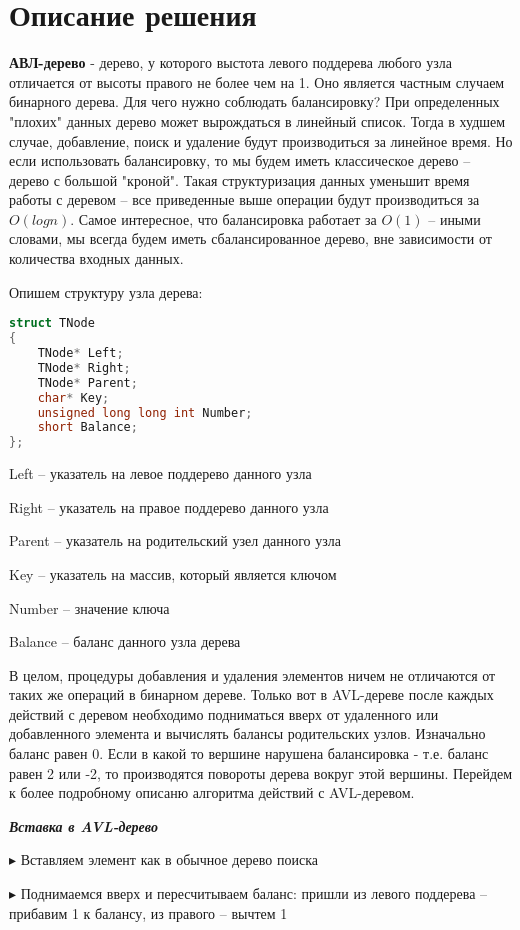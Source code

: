 \section{Описание решения}
\textbf{АВЛ-дерево} - дерево, у которого выстота левого поддерева любого узла отличается от высоты правого не более чем на 1. Оно является частным случаем бинарного дерева. Для чего нужно соблюдать балансировку? При определенных "плохих" данных дерево может вырождаться в линейный список. Тогда в худшем случае, добавление, поиск и удаление будут производиться за линейное время. Но если использовать балансировку, то мы будем иметь классическое дерево -- дерево с большой "кроной". Такая структуризация данных уменьшит время работы с деревом -- все приведенные выше операции будут производиться за $O(logn)$.
Самое интересное, что балансировка работает за $O(1)$ -- иными словами, мы всегда будем иметь сбалансированное дерево, вне зависимости от количества входных данных.

Опишем структуру узла дерева:
\begin{lstlisting}[language=C]
struct TNode
{
    TNode* Left;
    TNode* Right;
    TNode* Parent;
    char* Key;
    unsigned long long int Number;
    short Balance;
};
\end{lstlisting}
Left -- указатель на левое поддерево данного узла

Right -- указатель на правое поддерево данного узла

Parent -- указатель на родительский узел данного узла

Key -- указатель на массив, который является ключом

Number -- значение ключа

Balance -- баланс данного узла дерева

В целом, процедуры добавления и удаления элементов ничем не отличаются от таких же операций в бинарном дереве. Только вот в AVL-дереве после каждых действий с деревом необходимо подниматься вверх от удаленного или добавленного элемента и вычислять балансы родительских узлов. Изначально баланс равен 0. Если в какой то вершине нарушена балансировка - т.е. баланс равен 2 или -2, то производятся повороты дерева вокруг этой вершины. Перейдем к более подробному описаню алгоритма действий с AVL-деревом.

\textbf{\textit{Вставка в AVL-дерево}}

$\blacktriangleright$ Вставляем элемент как в обычное дерево поиска

$\blacktriangleright$ Поднимаемся вверх и пересчитываем баланс: пришли из
левого поддерева – прибавим 1 к балансу, из правого –
вычтем 1

